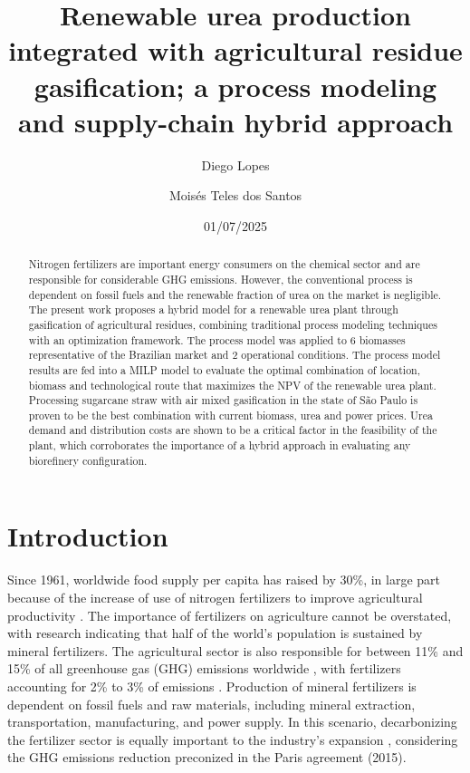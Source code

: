 \documentclass[a4paper, titlepage]{article}
\begin{document}
\title{Renewable urea production integrated with agricultural residue gasification; a process modeling and
supply-chain hybrid approach}
\author{
	Diego Lopes\\
	\and
	Moisés Teles dos Santos}
\date{01/07/2025}
\maketitle


\begin{abstract}
Nitrogen fertilizers are important energy consumers on the chemical sector and are responsible for considerable GHG
emissions. However, the conventional process is dependent on fossil fuels and the renewable fraction of urea on the
market is negligible. The present work proposes a hybrid model for a renewable urea plant through gasification of
agricultural residues, combining traditional process modeling techniques with an optimization framework. The process
model was applied to 6 biomasses representative of the Brazilian market and 2 operational conditions. The process model
results are fed into a MILP model to evaluate the optimal combination of location, biomass and technological route that
maximizes the NPV of the renewable urea plant. Processing sugarcane straw with air mixed gasification in the state of
São Paulo is proven to be the best combination with current biomass, urea and power prices. Urea demand and 
distribution costs are shown to be a critical factor in the feasibility of the plant, which corroborates the importance
of a hybrid approach in evaluating any biorefinery configuration. 
\end{abstract}

\section{Introduction}

Since 1961, worldwide food supply per capita has raised by 30\%, in large part because of the increase of use of
nitrogen fertilizers to improve agricultural productivity \cite{mbowIPCCSpecialReport2019}. The importance of
fertilizers on agriculture cannot be overstated, with research indicating that half of the world’s population
is sustained by mineral fertilizers. The agricultural sector is also responsible for between 11\% and 15\% of
all greenhouse gas (GHG) emissions worldwide \cite{ifaEstimatingReportingFertilizerRelated2016}, with fertilizers
accounting for 2\% to 3\% of emissions \cite{brentrupCarbonFootprintAnalysis2016}. Production of mineral fertilizers
is dependent on fossil fuels and raw materials, including mineral extraction,
transportation, manufacturing, and power supply. In this scenario, decarbonizing the fertilizer sector is equally
important to the industry’s expansion \cite{ouikhalfanNetZeroEmissionFertilizers2022}, considering the GHG emissions
reduction preconized in the Paris agreement (2015).
\end{document}
